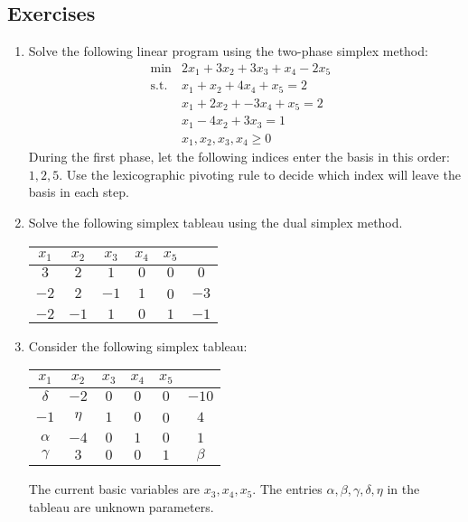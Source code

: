 \subsection*{Exercises}

\begin{enumerate}
\item Solve the following linear program using the two-phase simplex method:
\begin{eqnarray*}
\min &  2x_1 +3x_2 +3x_3 + x_4 - 2 x_5   & \\
\text{s.t.}   &  x_1 + x_2 + 4 x_4 + x_5    = 2  &  \\
    &   x_1 + 2x_2 +  - 3 x_4 + x_5    = 2 &  \\
    &    x_1 -4 x_2 + 3 x_3 = 1 &  \\
    &   x_1,x_2,x_3,x_4 \geq 0
\end{eqnarray*}
During the first phase, let the following indices enter the basis in this order: $1,2,5$.
Use the lexicographic pivoting rule to decide which index will leave the basis in each step.
\item Solve the following simplex tableau using the dual simplex method.
\begin{center}
\begin{tabular}[ht]{|c|c|c|c|c||c|}
  \hline
   $x_1$ & $x_2$ & $x_3$ & $x_4$ & $x_5$ &  \\
  \hline
    $3$ & $2$ & $1$ & $0$ & $0$  & $0$ \\
  \hline
  \hline
    $-2$ & $2$ & $-1$ & $1$ & 0 & $-3$\\
  \hline
	$-2$ & $-1$ & $1$ & $0$ & $1$ &  $-1$ \\
  \hline
\end{tabular}
\end{center}
\item Consider the following simplex tableau:
\begin{center}%
\begin{tabular}[ht]{|c|c|c|c|c||c|}
  \hline
   $x_1$ & $x_2$ & $x_3$ & $x_4$ & $x_5$ &  \\
  \hline
    $\delta$ & $-2$ & $0$ & $0$ & $0$  & $-10$ \\
  \hline
  \hline
    $-1$ & $\eta$ & $1$ & $0$ & 0 & $4$\\
  \hline
	$\alpha$ & $-4$ & $0$ & $1$ & $0$ &  $1$ \\
  \hline
	$\gamma$ & $3$ & $0$ & $0$ & $1$ &  $\beta$ \\
  \hline
\end{tabular}
\end{center}
The current basic variables are $x_3,x_4,x_5$.
The entries $\alpha, \beta, \gamma, \delta, \eta$ in the tableau are unknown parameters.


\end{enumerate}
